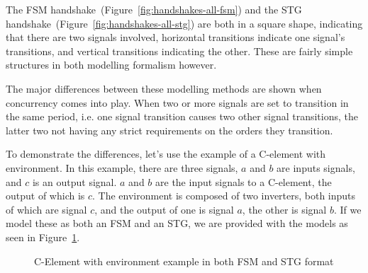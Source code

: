 The FSM handshake~(Figure~\ref{fig:handshakes-all-fsm}) and the STG handshake~(Figure~\ref{fig:handshakes-all-stg}) are both in a 
square shape, indicating that there are two signals involved, horizontal transitions indicate one signal's transitions, and vertical transitions 
indicating the other. These are fairly simple structures in both modelling formalism however. 

The major differences between these modelling methods are shown when concurrency comes into play. When two or more signals are
set to transition in the same period, i.e. one signal transition causes two other signal transitions, the latter two not having any
strict requirements on the orders they transition. 

To demonstrate the differences, let's use the example of a C-element with environment. In this example, there are three signals, 
$a$ and $b$ are inputs signals, and $c$ is an output signal. $a$ and $b$ are the input signals to a C-element, the output of which is $c$. 
The environment is composed of two inverters, both inputs of which are signal $c$, and the output of one is signal $a$, the other is signal $b$. 
If we model these as both an FSM and an STG, we are provided with the models as seen in Figure~\ref{fig:c-element-env}.

\begin{figure}[H]
\centering
{}
  \caption{\label{fig:c-element-env} C-Element with environment example in both FSM and STG format}
\end{figure}

